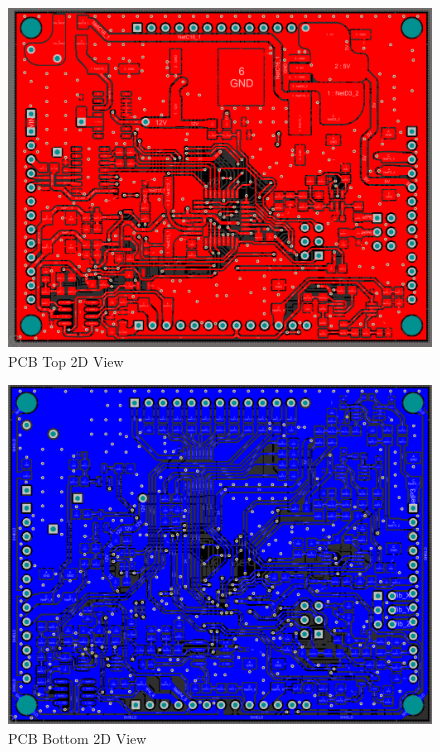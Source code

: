 		\begin{figure}[htbp]
			\centering
			\includegraphics[scale=0.9]{figuras/fig-pcb-design-top.png}
			\caption{PCB Top 2D View \cite{pcb-design-top}}
			\label{fig:pcb-design-top}
		\end{figure}

		\begin{figure}[htbp]
			\centering
			\includegraphics[scale=0.9]{figuras/fig-pcb-design-bottom.png}
			\caption{PCB Bottom 2D View \cite{pcb-design-bottom}}
			\label{fig:pcb-design-bottom}
		\end{figure}

